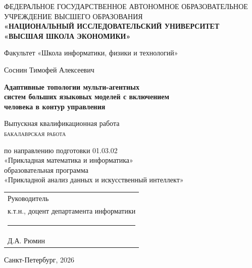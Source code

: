 
\thispagestyle{empty}
\begin{center}
\large

ФЕДЕРАЛЬНОЕ ГОСУДАРСТВЕННОЕ АВТОНОМНОЕ ОБРАЗОВАТЕЛЬНОЕ\\
УЧРЕЖДЕНИЕ ВЫСШЕГО ОБРАЗОВАНИЯ\\
\textbf{«НАЦИОНАЛЬНЫЙ ИССЛЕДОВАТЕЛЬСКИЙ УНИВЕРСИТЕТ\\
«ВЫСШАЯ ШКОЛА ЭКОНОМИКИ»}

\vspace{0.7cm}
Факультет «Школа информатики, физики и технологий»

\vfill

Соснин Тимофей Алексеевич

\vspace{0.8cm}
\Large
\textbf{Адаптивные топологии мульти-агентных\\
систем больших языковых моделей с включением\\
человека в контур управления}

\vspace{0.4cm}
\large
Выпускная квалификационная работа\\
\textsc{бакалаврская работа}

\vspace{0.6cm}
по направлению подготовки 01.03.02\\
«Прикладная математика и информатика»\\[0.2cm]
образовательная программа\\
«Прикладной анализ данных и искусственный интеллект»

\vfill

\begin{flushright}
\begin{tabular}{p{6.5cm}}
Руководитель \\[0.1cm]
к.т.н., доцент департамента информатики \\[0.4cm]
\rule{4.5cm}{0.3pt} \\
Д.А. Рюмин \\
\end{tabular}
\end{flushright}

\vfill
Санкт-Петербург, 2026
\end{center}
